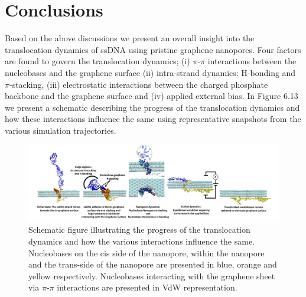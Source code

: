 \section[Conclusions]{Conclusions}
Based on the above discussions we present an overall insight into the translocation dynamics of ssDNA using pristine graphene nanopores. Four factors are found to govern the translocation dynamics; (i) $\pi$-$\pi$ interactions between the nucleobases and the graphene surface (ii) intra-strand dynamics: H-bonding and $\pi$-stacking, (iii) electrostatic interactions between the charged phosphate backbone and the graphene surface and (iv) applied external bias. In Figure 6.13 we present a schematic describing the progress of the translocation dynamics and how these interactions influence the same using representative snapshots from the various simulation trajectories. 
\begin{figure}[!h]
    \centering
    \includegraphics[width=\textwidth]{Chapter4/Figures/Figure_last.png}
    \caption[Schematic figure illustrating the progress of the translocation dynamics and how the various interactions influence the translocation dynamics]{Schematic figure illustrating the progress of the translocation dynamics and how the various interactions influence the same. Nucleobases on the cis side of the nanopore, within the nanopore and the trans-side of the nanopore are presented in blue, orange and yellow respectively. Nucleobases interacting with the graphene sheet via $\pi$-$\pi$ interactions are presented in VdW representation.}
\end{figure}

